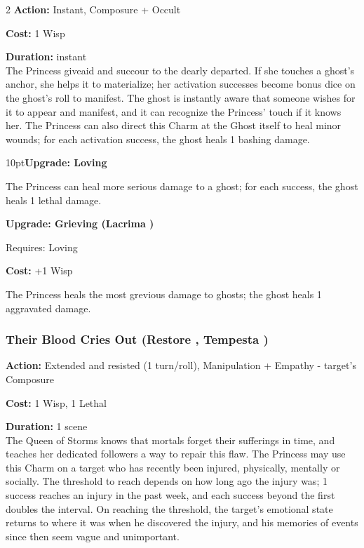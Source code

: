 \begin{multicols}{2}
\noindent \textbf{Action:} Instant, Composure + Occult

\noindent \textbf{Cost:} 1 Wisp

\noindent \textbf{Duration:} instant \\

\noindent The Princess giveaid and succour to the dearly departed. If she touches a ghost's anchor, she helps it to materialize; her activation successes become bonus dice on the ghost's roll to manifest. The ghost is instantly aware that someone wishes for it to appear and manifest, and it can recognize the Princess' touch if it knows her. The Princess can also direct this Charm at the Ghost itself to heal minor wounds; for each activation success, the ghost heals 1 bashing damage.
\begin{myindentpar}{10pt}\textbf{Upgrade: Loving}

The Princess can heal more serious damage to a ghost; for each success, the ghost heals 1 lethal damage.

\textbf{Upgrade: Grieving (Lacrima \textbullet\textbullet)}

\noindent Requires: Loving

\noindent \textbf{Cost:} +1 Wisp

The Princess heals the most grevious damage to ghosts; the ghost heals 1 aggravated damage.\end{myindentpar}

\subsubsection*{Their Blood Cries Out (Restore \textbullet\textbullet, Tempesta \textbullet\textbullet\textbullet)}

\noindent \textbf{Action:} Extended and resisted (1 turn/roll), Manipulation + Empathy - target's Composure

\noindent \textbf{Cost:} 1 Wisp, 1 Lethal
 
\noindent \textbf{Duration:} 1 scene \\

\noindent The Queen of Storms knows that mortals forget their sufferings in time, and teaches her dedicated followers a way to repair this flaw. The Princess may use this Charm on a target who has recently been injured, physically, mentally or socially. The threshold to reach depends on how long ago the injury was; 1 success reaches an injury in the past week, and each success beyond the first doubles the interval. On reaching the threshold, the target's emotional state returns to where it was when he discovered the injury, and his memories of events since then seem vague and unimportant.


\end{multicols}
